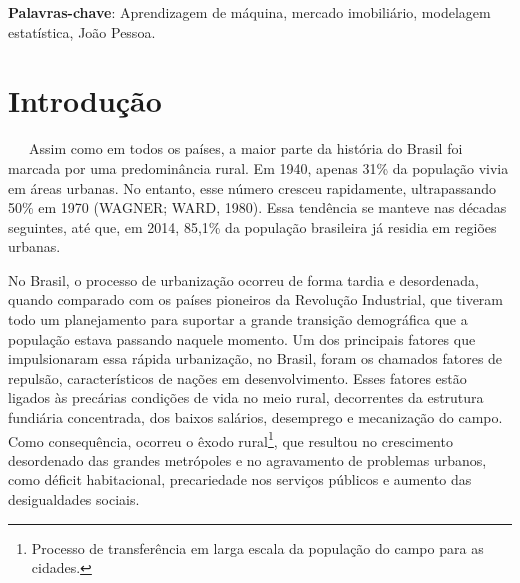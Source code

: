 \documentclass[
  12pt,
  a4paper,
]{scrreprt}
\renewcommand*\contentsname{Índice}
\newcommand\contentsname{Índice}
\renewcommand*\listfigurename{Lista de Figuras}
\newcommand\listfigurename{Lista de Figuras}
\renewcommand*\listtablename{Lista de Tabelas}
\newcommand\listtablename{Lista de Tabelas}
\begin{document}
\begin{flushleft}
\textbf{Palavras-chave}: Aprendizagem de máquina, mercado imobiliário, modelagem estatística, João Pessoa.
\end{flushleft}

\thispagestyle{empty}

\newpage

\bgroup
\hypersetup{linkcolor = black}

\cleardoublepage
\renewcommand{\listfigurename}{\centering{Lista de Figuras}}
\listoffigures
\thispagestyle{empty}

\cleardoublepage
\renewcommand{\listtablename}{\centering{Lista de Tabelas}}
\listoftables
\thispagestyle{empty}

\cleardoublepage
\renewcommand{\listalgorithmname}{\centering{Lista de Algoritmos}}
\listofalgorithms
\thispagestyle{empty}

\cleardoublepage
\renewcommand{\contentsname}{\centering{Sumário}}
\tableofcontents
{}
\thispagestyle{empty}

\egroup

\chapter{Introdução}\label{introduuxe7uxe3o}

~~~Assim como em todos os países, a maior parte da história do Brasil
foi marcada por uma predominância rural. Em 1940, apenas 31\% da
população vivia em áreas urbanas. No entanto, esse número cresceu
rapidamente, ultrapassando 50\% em 1970 (WAGNER; WARD, 1980). Essa
tendência se manteve nas décadas seguintes, até que, em 2014, 85,1\% da
população brasileira já residia em regiões urbanas.

\vspace{12pt}

No Brasil, o processo de urbanização ocorreu de forma tardia e
desordenada, quando comparado com os países pioneiros da Revolução
Industrial, que tiveram todo um planejamento para suportar a grande
transição demográfica que a população estava passando naquele momento.
Um dos principais fatores que impulsionaram essa rápida urbanização, no
Brasil, foram os chamados fatores de repulsão, característicos de nações
em desenvolvimento. Esses fatores estão ligados às precárias condições
de vida no meio rural, decorrentes da estrutura fundiária concentrada,
dos baixos salários, desemprego e mecanização do campo. Como
consequência, ocorreu o êxodo rural\footnote{Processo de transferência
  em larga escala da população do campo para as cidades.}, que resultou
no crescimento desordenado das grandes metrópoles e no agravamento de
problemas urbanos, como déficit habitacional, precariedade nos serviços
públicos e aumento das desigualdades sociais.
\end{document}
